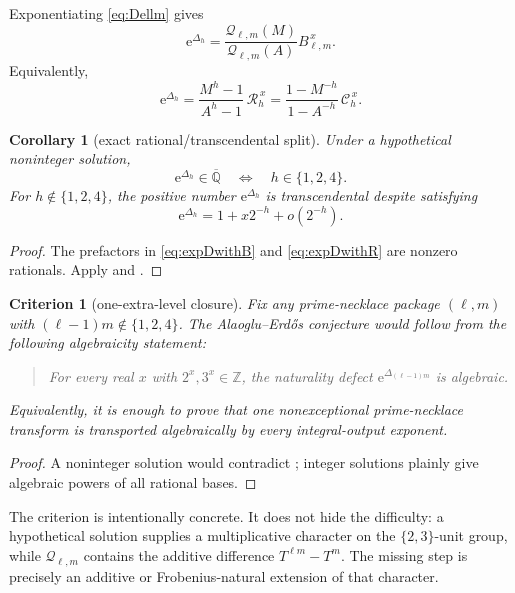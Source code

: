 \documentclass[11pt]{article}
\numberwithin{equation}{section}
\newtheorem{corollary}[theorem]{Corollary}
\newtheorem{criterion}[theorem]{Criterion}
\theoremstyle{definition}
\theoremstyle{remark}
\newcommand{\Z}{\mathbb Z}
\newcommand{\QQbar}{\overline{\mathbb Q}}
\newcommand{\e}{\mathrm e}
\begin{document}
Exponentiating \eqref{eq:Dellm} gives
\begin{equation}\label{eq:expDwithB}
  \e^{\Delta_h}
  =\frac{\mathcal Q_{\ell,m}(M)}{\mathcal Q_{\ell,m}(A)}
   B_{\ell,m}^{\,x}.
\end{equation}
Equivalently,
\begin{equation}\label{eq:expDwithR}
  \e^{\Delta_h}
  =\frac{M^h-1}{A^h-1}\,\mathcal R_h^{\,x}
  =\frac{1-M^{-h}}{1-A^{-h}}\,\mathcal C_h^{\,x}.
\end{equation}

\begin{corollary}[exact rational/transcendental split]\label{cor:split}
Under a hypothetical noninteger solution,
\begin{equation}\label{eq:split}
  \e^{\Delta_h}\in\QQbar
  \quad\Longleftrightarrow\quad
  h\in\{1,2,4\}.
\end{equation}
For $h\notin\{1,2,4\}$, the positive number $\e^{\Delta_h}$ is transcendental despite satisfying
\begin{equation}\label{eq:nearone}
  \e^{\Delta_h}=1+x2^{-h}+o(2^{-h}).
\end{equation}
\end{corollary}

\begin{proof}
The prefactors in \eqref{eq:expDwithB} and \eqref{eq:expDwithR} are nonzero rationals.  Apply  and .
\end{proof}

\begin{criterion}[one-extra-level closure]\label{crit:onelevel}
Fix any prime-necklace package $(\ell,m)$ with $(\ell-1)m\notin\{1,2,4\}$.  The Alaoglu--Erd\H{o}s conjecture would follow from the following algebraicity statement:
\begin{quote}
For every real $x$ with $2^x,3^x\in\Z$, the naturality defect $\e^{\Delta_{(\ell-1)m}}$ is algebraic.
\end{quote}
Equivalently, it is enough to prove that one nonexceptional prime-necklace transform is transported algebraically by every integral-output exponent.
\end{criterion}

\begin{proof}
A noninteger solution would contradict ; integer solutions plainly give algebraic powers of all rational bases.
\end{proof}

The criterion is intentionally concrete.  It does not hide the difficulty: a hypothetical solution supplies a multiplicative character on the $\{2,3\}$-unit group, while $\mathcal Q_{\ell,m}$ contains the additive difference $T^{\ell m}-T^m$.  The missing step is precisely an additive or Frobenius-natural extension of that character.
\end{document}
